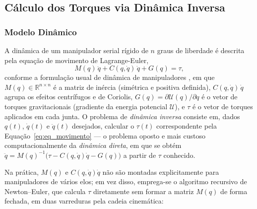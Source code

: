 \subsection{Cálculo dos Torques via Dinâmica Inversa}

\subsubsection{Modelo Dinâmico}

A dinâmica de um manipulador serial rígido de $n$ graus de liberdade é
descrita pela equação de movimento de Lagrange-Euler,
\begin{equation}
M(q)\,\ddot{q} + C(q,\dot{q})\,\dot{q} + G(q) = \tau,
\label{eq:eq_movimento}
\end{equation}
conforme a formulação usual de dinâmica de manipuladores \cite{spong2006,siciliano2010,alkmin2026dinamica}, em que $M(q) \in \mathbb{R}^{n\times n}$ é a matriz de inércia (simétrica e
positiva definida), $C(q,\dot{q})\,\dot{q}$ agrupa os efeitos centrífugos e
de Coriolis, $G(q) = \partial \mathcal{U}(q)/\partial q$ é o vetor de
torques gravitacionais (gradiente da energia potencial $\mathcal{U}$), e
$\tau$ é o vetor de torques aplicados em cada junta. O problema de
\textit{dinâmica inversa} consiste em, dados $q(t)$, $\dot{q}(t)$ e
$\ddot{q}(t)$ desejados, calcular o $\tau(t)$ correspondente pela
Equação~\eqref{eq:eq_movimento} — o problema oposto e mais custoso
computacionalmente da \textit{dinâmica direta}, em que se obtém
$\ddot{q} = M(q)^{-1}\big(\tau - C(q,\dot{q})\dot{q} - G(q)\big)$ a partir
de $\tau$ conhecido.

Na prática, $M(q)$ e $C(q,\dot{q})\dot{q}$ não são montadas explicitamente
para manipuladores de vários elos; em vez disso, emprega-se o algoritmo
recursivo de Newton--Euler, que calcula $\tau$ diretamente sem formar a
matriz $M(q)$ de forma fechada, em duas varreduras pela cadeia cinemática:

